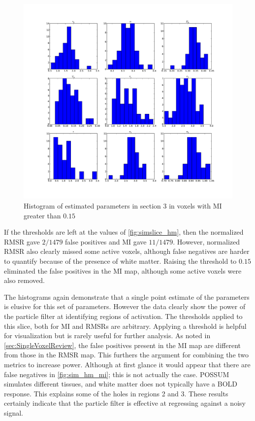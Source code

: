 \begin{figure} %
\centering
\includegraphics[clip=true,trim=2.5cm 2cm 2cm 1cm,width=\textwidth]{images/slicesim_hist3}
\caption
{Histogram of estimated parameters in section 3 in voxels with \acs{MI} greater
than $0.15$}
\label{fig:slicesim_hist3}
\end{figure}

If the thresholds are left at the values of \autoref{fig:simslice_hm}, then
the normalized \ac{RMSR} gave $2/1479$  false positives and \ac{MI} gave
$11/1479$. However, normalized \ac{RMSR} also clearly missed some active voxels, although
false negatives are harder to quantify because of the presence of white matter.
Raising the threshold to $0.15$ eliminated the false positives in the
\ac{MI} map, although some active voxels were also removed.

The histograms again demonstrate that a single point estimate of the parameters
is elusive for this set of parameters. However the data clearly show the power
of the particle filter at identifying regions of activation.
The thresholds applied to this slice, both for \ac{MI} and
\acp{RMSR} are arbitrary. Applying a
threshold is helpful for visualization but is rarely useful for further analysis.
As noted in \autoref{sec:SingleVoxelReview},
the false positives present in the \ac{MI}
map are different from those in the \ac{RMSR} map. This furthers the argument
for combining the two metrics to increase power. Although
at first glance it would appear that there are false negatives in
\autoref{fig:sim_hm_mi}; this is
not actually the case. \ac{POSSUM} simulates different tissues, and white matter
does not typically  have a \ac{BOLD} response. This explains some of the 
holes in regions
2 and 3. These results certainly indicate that the particle filter is effective
at regressing against a noisy signal.
